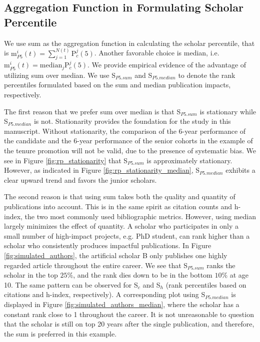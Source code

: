\begin{refsection}
\section{Aggregation Function in Formulating Scholar Percentile}
\label{sec:suppl_aggfun}

We use sum as the aggregation function in calculating the scholar percentile, that is $\text{m}_{P5}^{i}(t)= \sum_{j=1}^{N(t)} \text{P}_{c}^{j}(5)$. Another favorable choice is median, i.e. $\text{m}_{P5}^{i}(t) = \text{median}_{j}\text{P}_{c}^{j}(5)$. We provide empirical evidence of the advantage of utilizing sum over median. We use S$_{P5.sum}$ and S$_{P5.median}$ to denote the rank percentiles formulated based on the sum and median publication impacts, respectively.

The first reason that we prefer sum over median is that S$_{P5.sum}$ is stationary while S$_{P5.median}$ is not. Stationarity provides the foundation for the study in this manuscript. Without stationarity, the comparison of the 6-year performance of the candidate and the 6-year performance of the senior cohorts in the example of the tenure promotion will not be valid, due to the presence of systematic bias. We see in Figure \ref{fig:rp_stationarity} that S$_{P5.sum}$ is approximately stationary. However, as indicated in Figure \ref{fig:rp_stationarity_median}, S$_{P5.median}$ exhibits a clear upward trend and favors the junior scholars. 

The second reason is that using sum takes both the quality and quantity of publications into account. This is in the same spirit as citation counts and h-index, the two most commonly used bibliographic metrics. However, using median largely minimizes the effect of quantity. A scholar who participates in only a small number of high-impact projects, e.g. PhD student, can rank higher than a scholar who consistently produces impactful publications. In Figure \ref{fig:simulated_authors}, the artificial scholar B only publishes one highly regarded article throughout the entire career. We see that S$_{P5.sum}$ ranks the scholar in the top $25\%$, and the rank dies down to be in the bottom $10\%$ at age 10. The same pattern can be observed for S$_{c}$ and S$_{h}$ (rank percentiles based on citations and h-index, respectively). A corresponding plot using S$_{P5.median}$ is displayed in Figure \ref{fig:simulated_authors_median}, where the scholar has a constant rank close to 1 throughout the career. It is not unreasonable to question that the scholar is still on top 20 years after the single publication, and therefore, the sum is preferred in this example.


\end{refsection}
